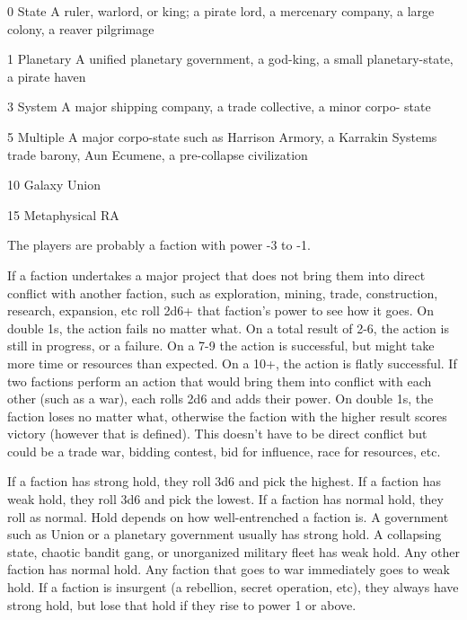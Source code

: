             0          State            A ruler, warlord, or king; a pirate lord, a mercenary company,
                                        a large colony, a reaver pilgrimage

            1          Planetary        A unified planetary government, a god-king, a small
                                         planetary-state, a pirate haven

            3          System           A major shipping company, a trade collective, a minor corpo-
                                        state

            5          Multiple         A major corpo-state such as Harrison Armory, a Karrakin
                       Systems          trade barony, Aun Ecumene, a pre-collapse civilization

            10         Galaxy            Union

            15         Metaphysical      RA

The players are probably a faction with power -3 to -1.




If a faction undertakes a major project that does not bring them into direct conflict with another
faction, such as exploration, mining, trade, construction, research, expansion, etc roll 2d6+ that
faction’s power to see how it goes. On double 1s, the action fails no matter what. On a total result
of 2-6, the action is still in progress, or a failure. On a 7-9 the action is successful, but might take
more time or resources than expected. On a 10+, the action is flatly successful.
If two factions perform an action that would bring them into conflict with each other (such
as a war), each rolls 2d6 and adds their power. On double 1s, the faction loses no matter what,
otherwise the faction with the higher result scores victory (however that is defined). This doesn’t
have to be direct conflict but could be a trade war, bidding contest, bid for influence, race for
resources, etc.

If a faction has strong hold, they roll 3d6 and pick the highest. If a faction has weak hold, they roll
3d6 and pick the lowest. If a faction has normal hold, they roll as normal. Hold depends on how
well-entrenched a faction is. A government such as Union or a planetary government usually has
strong hold. A collapsing state, chaotic bandit gang, or unorganized military fleet has weak hold.
Any other faction has normal hold. Any faction that goes to war immediately goes to weak hold. If
a faction is insurgent (a rebellion, secret operation, etc), they always have strong hold, but lose
that hold if they rise to power 1 or above.

